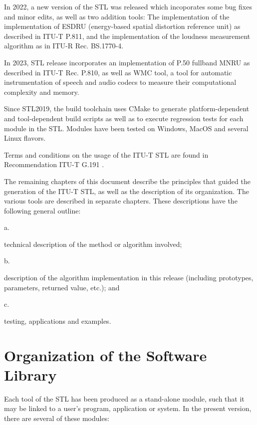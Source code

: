 In 2022, a new version of the STL was released which incoporates some bug fixes and minor edits, as well as two addition tools:
The implementation of the implementation of ESDRU (energy-based spatial distortion reference unit) as described in ITU-T P.811, and the implementation of the loudness measurement algorithm as in ITU-R Rec. BS.1770-4.

In 2023, STL release incorporates an implementation of P.50 fullband MNRU as described in ITU-T Rec. P.810, as well as WMC tool, a tool for automatic instrumentation of speech and audio codecs to measure their computational complexity and memory.

Since STL2019, the build toolchain uses CMake to generate platform-dependent and tool-dependent build scripts as well as to execute regression tests for each module in the STL.
Modules have been tested on Windows, MacOS and several Linux flavors.

Terms and conditions on the usage of the ITU-T STL are found in Recommendation ITU-T G.191 \cite{G.191}.

The remaining chapters of this document describe the principles that guided the generation of the ITU-T STL, as well as the description of its organization.
The various tools are described in separate chapters.
These descriptions have the following general outline:

 a. \parbox[t]{140mm}{
               technical description of the method or algorithm involved;}

 b. \parbox[t]{140mm}{
               description of the algorithm implementation in this release (including prototypes, parameters, returned value, etc.); and }

 c. \parbox[t]{140mm}{
               testing, applications and examples.}




\section{Organization of the Software Library}

Each tool of the STL has been produced as a stand-alone module, such
that it may be linked to a user's program, application or system. In
the present version, there are several of these modules:

